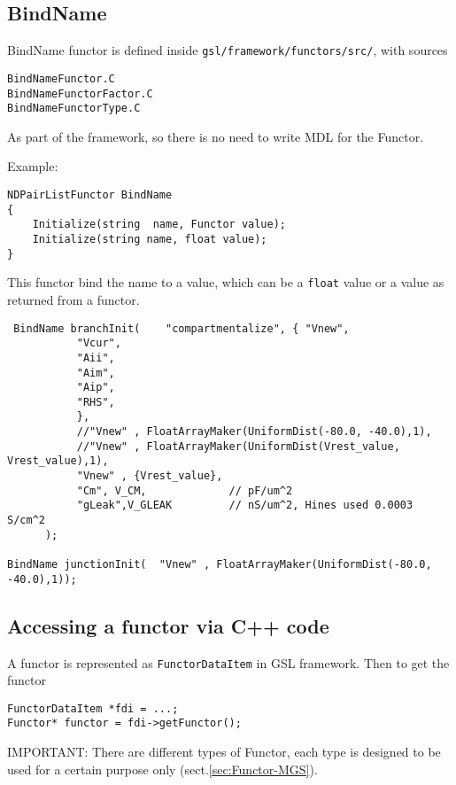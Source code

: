 \subsection{BindName}
\label{sec:BindNameFunctor}

BindName functor is defined inside \verb!gsl/framework/functors/src/!, with sources
\begin{verbatim}
BindNameFunctor.C
BindNameFunctorFactor.C
BindNameFunctorType.C
\end{verbatim}
As part of the framework, so there is no need to write MDL for the Functor.

Example:
\begin{verbatim}
NDPairListFunctor BindName
{
	Initialize(string  name, Functor value);
	Initialize(string name, float value);
}
\end{verbatim}
This functor bind the name to a value, which can be a \verb!float! value or a value as 
returned from a functor.

\begin{verbatim}
 BindName branchInit(    "compartmentalize", { "Vnew",
           "Vcur",
           "Aii",
           "Aim",
           "Aip",
           "RHS",
           },
           //"Vnew" , FloatArrayMaker(UniformDist(-80.0, -40.0),1),
           //"Vnew" , FloatArrayMaker(UniformDist(Vrest_value, Vrest_value),1),
           "Vnew" , {Vrest_value},
           "Cm", V_CM,             // pF/um^2
           "gLeak",V_GLEAK         // nS/um^2, Hines used 0.0003 S/cm^2
      );

BindName junctionInit(  "Vnew" , FloatArrayMaker(UniformDist(-80.0, -40.0),1));
\end{verbatim}



\subsection{Accessing a functor via C++ code}
\label{sec:functor-access-via-C++-code}

A functor is represented as \verb!FunctorDataItem! in GSL framework. Then to get
the functor
\begin{verbatim}
FunctorDataItem *fdi = ...;
Functor* functor = fdi->getFunctor();
\end{verbatim}

IMPORTANT: There are different types of Functor, each type is designed to be
used for a certain purpose only (sect.\ref{sec:Functor-MGS}).

